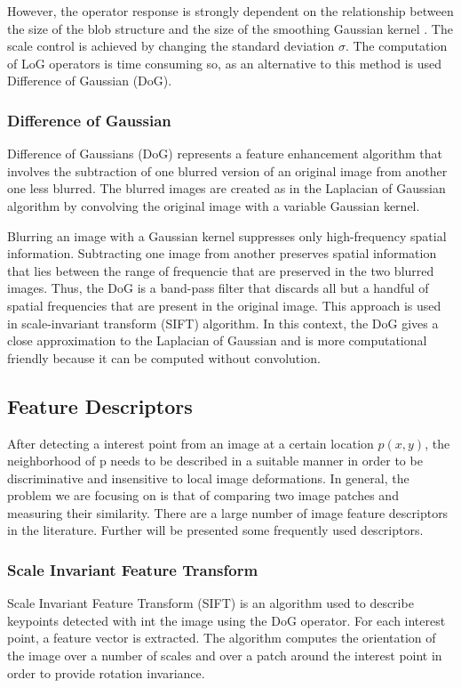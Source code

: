 \documentclass[9pt,shortpaper,twoside,web]{ieeecolor}
\begin{document}
 However, the operator response is strongly dependent on the relationship between the size of the blob structure and the size of the smoothing Gaussian kernel \cite{b2}. The scale control is achieved by changing the standard deviation $\sigma$. The computation of LoG operators is time consuming so, as an alternative to this method is used Difference of Gaussian (DoG).
\\

\subsubsection{Difference of Gaussian}
Difference of Gaussians (DoG) represents a feature enhancement algorithm that involves the subtraction of one blurred version of an original image from another one less blurred. The blurred images are created as in the Laplacian of Gaussian algorithm by convolving the original image with a variable Gaussian kernel.

Blurring an image with a Gaussian kernel suppresses only high-frequency spatial information. Subtracting one image from another preserves spatial information that lies between the range of frequencie that are preserved in the two blurred images. Thus, the DoG is a band-pass filter that discards all but a handful of spatial frequencies that are present in the original image. This approach is used in scale-invariant transform (SIFT) algorithm. In this context, the DoG gives a close approximation to the Laplacian of Gaussian and is more computational friendly because it can be computed without convolution.

\subsection{Feature Descriptors}
After detecting a interest point from an image at a certain location $p(x, y)$, the neighborhood of p needs to be described in a suitable manner in order to be discriminative and insensitive to local image deformations. In general, the problem we are focusing on is that of comparing two image patches and measuring their similarity. There are a large number of image feature descriptors in the literature. Further will be presented some frequently used descriptors.
\\

\subsubsection{Scale Invariant Feature Transform}
Scale Invariant Feature Transform (SIFT) is an algorithm used to describe keypoints detected with int the image using the DoG operator. For each interest point, a feature vector is extracted. The algorithm computes the orientation of the image over a number of scales and over a patch around the interest point in order to provide rotation invariance.
\end{document}
